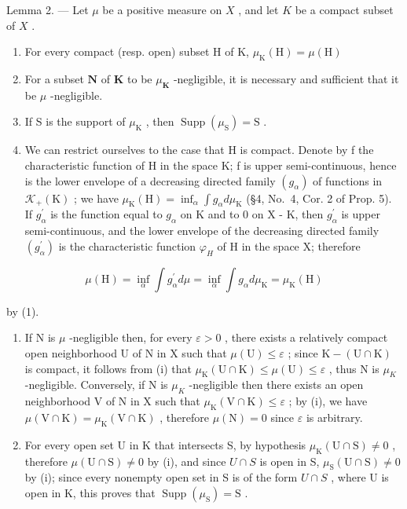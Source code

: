 Lemma 2. --- Let \(\mu\) be a positive measure on \(X\) , and let \(K\) be a compact subset of \(X\) .

\begin{enumerate}
\def\labelenumi{(\roman{enumi})}
\item
  For every compact (resp. open) subset H of K, \(\mu_{\mathrm{K}}(\mathrm{H}) = \mu (\mathrm{H})\)
\item
  For a subset \(\mathbf{N}\) of \(\mathbf{K}\) to be \(\mu_{\mathbf{K}}\) -negligible, it is necessary and sufficient that it be \(\mu\) -negligible.
\item
  If S is the support of \(\mu_{\mathrm{K}}\) , then \(\operatorname{Supp}(\mu_{\mathrm{S}}) = \mathrm{S}\) .
\setcounter{enumi}{0}
\item
  We can restrict ourselves to the case that H is compact. Denote by f the characteristic function of H in the space K; f is upper semi-continuous, hence is the lower envelope of a decreasing directed family \((g_{\alpha})\) of functions in \(\mathcal{K}_{+}(\mathrm{K})\) ; we have \(\mu_{\mathrm{K}}(\mathrm{H}) = \inf_{\alpha} \int g_{\alpha} d\mu_{\mathrm{K}}\) (§4, No.~4, Cor. 2 of Prop. 5). If \(g_{\alpha}^{\prime}\) is the function equal to \(g_{\alpha}\) on K and to 0 on X - K, then \(g_{\alpha}^{\prime}\) is upper semi-continuous, and the lower envelope of the decreasing directed family \((g_{\alpha}^{\prime})\) is the characteristic function \(\varphi_{H}\) of H in the space X; therefore
\end{enumerate}

\[
\mu (\mathrm{H}) = \inf _ {\alpha} \int g _ {\alpha} ^ {\prime} d \mu = \inf _ {\alpha} \int g _ {\alpha} d \mu_ {\mathrm{K}} = \mu_ {\mathrm{K}} (\mathrm{H})
\]

by (1).

\begin{enumerate}
\def\labelenumi{(\roman{enumi})}
\setcounter{enumi}{1}
\item
  If N is \(\mu\) -negligible then, for every \(\varepsilon > 0\) , there exists a relatively compact open neighborhood U of N in X such that \(\mu(\mathrm{U}) \leqslant \varepsilon\) ; since \(\mathrm{K} - (\mathrm{U} \cap \mathrm{K})\) is compact, it follows from (i) that \(\mu_{\mathrm{K}}(\mathrm{U} \cap \mathrm{K}) \leqslant \mu(\mathrm{U}) \leqslant \varepsilon\) , thus N is \(\mu_{K}\) -negligible. Conversely, if N is \(\mu_{K}\) -negligible then there exists an open neighborhood V of N in X such that \(\mu_{\mathrm{K}}(\mathrm{V} \cap \mathrm{K}) \leqslant \varepsilon\) ; by (i), we have \(\mu(\mathrm{V} \cap \mathrm{K}) = \mu_{\mathrm{K}}(\mathrm{V} \cap \mathrm{K})\) , therefore \(\mu(\mathrm{N}) = 0\) since \(\varepsilon\) is arbitrary.
\item
  For every open set U in K that intersects S, by hypothesis \(\mu_{\mathrm{K}}(\mathrm{U}\cap\mathrm{S})\neq0\) , therefore \(\mu(\mathrm{U}\cap\mathrm{S})\neq0\) by (i), and since \(U\cap S\) is open in S, \(\mu_{\mathrm{S}}(\mathrm{U}\cap\mathrm{S})\neq0\) by (i); since every nonempty open set in S is of the form \(U\cap S\) , where U is open in K, this proves that \(\operatorname{Supp}(\mu_{\mathrm{S}})=\mathrm{S}\) .
\end{enumerate}

